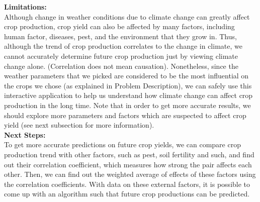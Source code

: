 \documentclass[fontsize=11pt]{article}
\begin{document}
\textbf{Limitations:}\\

Although change in weather conditions due to climate change can greatly affect crop production, crop yield can also be affected by many factors, including human factor, diseases, pest, and the environment that they grow in. Thus, although the trend of crop production correlates to the change in climate, we cannot accurately determine future crop production just by viewing climate change alone. (Correlation does not mean causation). Nonetheless, since the weather parameters that we picked are considered to be the most influential on the crops we chose (as explained in Problem Description), we can safely use this interactive application to help us understand how climate change can affect crop production in the long time. Note that in order to get more accurate results, we should explore more parameters and factors which are suspected to affect crop yield (see next subsection for more information).\\

\textbf{Next Steps:}\\

To get more accurate predictions on future crop yields, we can compare crop production trend with other factors, such as pest, soil fertility and such, and find out their correlation coefficient, which measures how strong the pair affects each other. Then, we can find out the weighted average of effects of these factors using the correlation coefficients. With data on these external factors, it is possible to come up with an algorithm such that future crop productions can be predicted.
\end{document}

